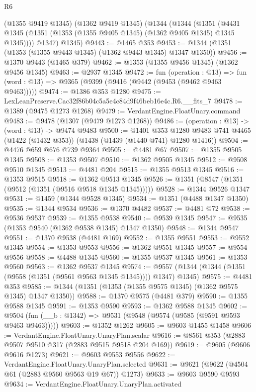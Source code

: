 \begin{lexlean}{R6}
\begin{coremodule}
    (@1355 @9419 @1345)
    (@1362 @9419 @1345)
    (@1344
      (@1344
        (@1351 (@4431 @1345 (@1351 (@1353 (@1355 @9405 @1345) (@1362 @9405 @1345) @1345 @1345))))
        @1347)
      @1345)
@9443 := @1465 @353
@9453 := @1344 (@1351 (@1353 (@1355 @9443 @1345) (@1362 @9443 @1345) @1347 @1350))
@9456 := @1370 @9443 (@1465 @379)
@9462 := @1353 (@1355 @9456 @1345) (@1362 @9456 @1345)
@9463 := @2937 @1345
@9472 := fun (operation : @13) =>
  fun (word : @13) => @9365 (@9399 (@9416 (@9442 (@9453 (@9462 @9463 @9463)))))
@9474 := @1386 @353 @1280
@9475 := LexLeanPreserve.Cac32f86b04c5a5e4c84d9f46beb16e4c.R6.__fits_7
@9478 := @1389 (@9475 @1273 @1268)
@9479 := VerdantEngine.FloatUnary.command
@9483 := @9478 (@1307 (@9479 @1273 @1268))
@9486 := (operation : @13) -> (word : @13) -> @9474 @9483
@9500 := @1401
    @353
    @1280
    @9483
    @741
    @4465
    (@1422 (@1432 @353))
    (@1438 (@1439 (@1440 @741) @1280 @1416))
@9504 := @4476 @659 @676 @739 @9364
@9505 := @4481 @67
@9507 := @1355 @9505 @1345
@9508 := @1353 @9507
@9510 := @1362 @9505 @1345
@9512 := @9508 @9510 @1345
@9513 := @4481 @204
@9515 := @1355 @9513 @1345
@9516 := @1353 @9515
@9518 := @1362 @9513 @1345
@9526 := @1351 (@8547 (@1351 (@9512 (@1351 (@9516 @9518 @1345 @1345)))))
@9528 := @1344 @9526 @1347
@9531 := @1459 (@1344 @9528 @1345)
@9534 := @1351 (@4488 @1347 @1350)
@9535 := @1344 @9534
@9536 := @1370 @4482
@9537 := @4481 @72
@9538 := @9536 @9537
@9539 := @1355 @9538
@9540 := @9539 @1345
@9547 := @9535 (@1353 @9540 (@1362 @9538 @1345) @1347 @1350)
@9548 := @1344 @9547
@9551 := @1370 @9538 (@4481 @169)
@9552 := @1355 @9551
@9553 := @9552 @1345
@9554 := @1353 @9553
@9556 := @1362 @9551 @1345
@9557 := @9554 @9556
@9558 := @4488 @1345
@9560 := @1355 @9537 @1345
@9561 := @1353 @9560
@9563 := @1362 @9537 @1345
@9574 := @9557 (@1344 (@1344 (@1351 (@9558 (@1351 (@9561 @9563 @1345 @1345)))) @1347) @1345)
@9575 := @4481 @353
@9585 := @1344 (@1351 (@1353 (@1355 @9575 @1345) (@1362 @9575 @1345) @1347 @1350))
@9588 := @1370 @9575 (@4481 @379)
@9590 := @1355 @9588 @1345
@9591 := @1353 @9590
@9593 := @1362 @9588 @1345
@9602 := @9504 (fun (__b : @1342) => @9531 (@9548 (@9574 (@9585 (@9591 @9593 @9463 @9463)))))
@9603 := @1352 @1262
@9605 := @9603 @1455 @1458
@9606 := VerdantEngine.FloatUnary.UnaryPlan.scalar
@9616 := @8561 @353 (@2883 @9507 @9510 @317 (@2883 @9515 @9518 @204 @169))
@9619 := @9605 (@9606 @9616 @1273)
@9621 := @9603 @9553 @9556
@9622 := VerdantEngine.FloatUnary.UnaryPlan.selected
@9631 := @9621 (@9622 (@4504 @61 (@2883 @9560 @9563 @19 @67)) @1273)
@9633 := @9603 @9590 @9593
@9634 := VerdantEngine.FloatUnary.UnaryPlan.activated

\end{coremodule}
\end{lexlean}
